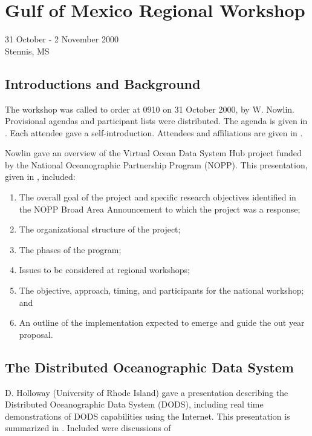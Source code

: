 \renewcommand{\chaptertitle}{Gulf of Mexico Regional Workshop}
\chapter{\chaptertitle}


\begin{center}31 October - 2 November 2000\\
Stennis, MS
\end{center}

\section{Introductions and Background}

The workshop was called to order at 0910 on 31 October 2000, by W.
Nowlin. Provisional agendas and participant lists were distributed.
The agenda is given in . Each attendee gave a
self-introduction. Attendees and affiliations are given in
.

Nowlin gave an overview of the Virtual Ocean Data System Hub project
funded by the National Oceanographic Partnership Program (NOPP). This
presentation, given in , included:

\begin{enumerate}
\item The overall goal of the project and specific research objectives
  identified in the NOPP Broad Area Announcement to which the project
  was a response;  
\item The organizational structure of the project;
\item The phases of the program;
\item Issues to be considered at regional workshops;
\item The objective, approach, timing, and participants for the
  national workshop; and 
\item An outline of the implementation expected to emerge and guide
  the out year proposal.  
\end{enumerate}

\section{The Distributed Oceanographic Data System}

D. Holloway (University of Rhode Island) gave a presentation
describing the Distributed Oceanographic Data System (DODS), including
real time demonstrations of DODS capabilities using the Internet. This
presentation is summarized in . Included were
discussions of

